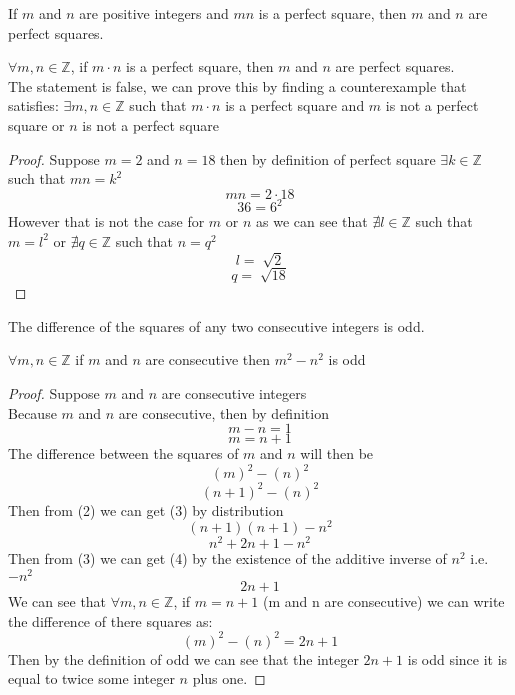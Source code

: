 \documentclass[12pt,letterpaper, onecolumn]{exam}
\begin{document}
\begin{questions}
		\setcounter{question}{56} \question If $m$ and $n$ are positive integers and $mn$ is a perfect square, then $m$ and $n$ are perfect squares.   
		
		\begin{solution}
			$\forall m,n \in \mathbb{Z}$, if $m\cdot n$ is a perfect square, then $m$ and $n$ are perfect squares.\\
			The statement is false, we can prove this by finding a counterexample that satisfies:
			$\exists m,n \in \mathbb{Z}$ such that $m\cdot n$  is a perfect square and $m$ is not a perfect square or $n$ is not a perfect square
			\begin{proof}
				Suppose $m=2$ and $n=18$ then by definition of perfect square $\exists k \in \mathbb{Z}$ such that $mn = k^2$
				$$mn = 2\cdot18$$
				$$36 = 6^2$$
				However that is not the case for $m$ or $n$ as we can see that $\nexists l \in \mathbb{Z}$ such that $m=l^2$ or $\nexists q \in \mathbb{Z}$ such that $n=q^2$
				$$l = \sqrt[]{2}$$
				$$q = \sqrt[]{18}$$
			\end{proof}
		\end{solution}
		
		\setcounter{question}{57} \question The difference of the squares of any two consecutive integers is odd. 
		
		\begin{solution}
			$\forall m,n \in \mathbb{Z}$ if $m$ and $n$ are consecutive then $m^2-n^2$ is odd
			\begin{proof}
				Suppose $m$ and $n$ are consecutive integers\\
				Because $m$ and $n$ are consecutive, then by definition\\
				\[m-n=1\]
				\[m=n+1\]
				The difference between the squares of $m$ and $n$ will then be
				\[(m)^2-(n)^2\tag{1}\]
				\[(n+1)^2-(n)^2\tag{2}\]
				Then from (2) we can get (3) by distribution 
				\[(n+1)(n+1)-n^2\]
				\[n^2+2n+1-n^2\tag{3}\]
				Then from (3) we can get (4) by the existence of the additive inverse of $n^2$ i.e. $-n^2$
				\[2n+1\tag{4}\]
				We can see that $\forall m,n \in \mathbb{Z}$, if $m=n+1$ (m and n are consecutive) we can write the difference of there squares as:
				$$(m)^2-(n)^2=2n+1$$
				Then by the definition of odd we can see that the integer $2n+1$ is odd since it is equal to twice some integer $n$ plus one.
				
				
				
				
				
			\end{proof}
		\end{solution}
	\end{questions}
\end{document}

